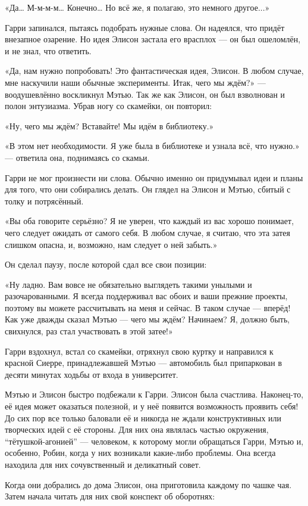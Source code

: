 \documentclass[a5paper, 9pt,
final, openany, twoside=true]{memoir}
\begin{document}
«Да… М-м-м-м… Конечно… Но всё же, я полагаю, это немного другое...»

Гарри запинался, пытаясь подобрать нужные слова. Он надеялся, что придёт внезапное озарение. Но идея Элисон застала его врасплох — он был ошеломлён, и не знал, что ответить.

«Да, нам нужно попробовать! Это фантастическая идея, Элисон. В любом случае, мне наскучили наши обычные эксперименты. Итак, чего мы ждём?» — воодушевлённо воскликнул Мэтью. Так же как Элисон, он был взволнован и полон энтузиазма. Убрав ногу со скамейки, он повторил:

«Ну, чего мы ждём? Вставайте! Мы идём в библиотеку.»

«В этом нет необходимости. Я уже была в библиотеке и узнала всё, что нужно.» — ответила она, поднимаясь со скамьи.

Гарри не мог произнести ни слова. Обычно именно он придумывал идеи и планы для того, что они собирались делать. Он глядел на Элисон и Мэтью, сбитый с толку и потрясённый.

«Вы оба говорите серьёзно? Я не уверен, что каждый из вас хорошо понимает, чего следует ожидать от самого себя. В любом случае, я считаю, что эта затея слишком опасна, и, возможно, нам следует о ней забыть.»

Он сделал паузу, после которой сдал все свои позиции:

«Ну ладно. Вам вовсе не обязательно выглядеть такими унылыми и разочарованными. Я всегда поддерживал вас обоих и ваши прежние проекты, поэтому вы можете рассчитывать на меня и сейчас. В таком случае — вперёд! Как уже дважды сказал Мэтью — чего мы ждём? Начинаем? Я, должно быть, свихнулся, раз стал участвовать в этой затее!»

Гарри вздохнул, встал со скамейки, отряхнул свою куртку и направился к красной Сиерре, принадлежавшей Мэтью — автомобиль был припаркован в десяти минутах ходьбы от входа в университет.

Мэтью и Элисон быстро подбежали к Гарри. Элисон была счастлива. Наконец-то, её идея может оказаться полезной, и у неё появится возможность проявить себя! До сих пор все только баловали её и никогда не ждали конструктивных или творческих идей с её стороны. Для них она являлась частью окружения, ``тётушкой-агонией'' — человеком, к которому могли обращаться Гарри, Мэтью и, особенно, Робин, когда у них возникали какие-либо проблемы. Она всегда находила для них сочувственный и деликатный совет.

Когда они добрались до дома Элисон, она приготовила каждому по чашке чая. Затем начала читать для них свой конспект об оборотнях:
\end{document}
